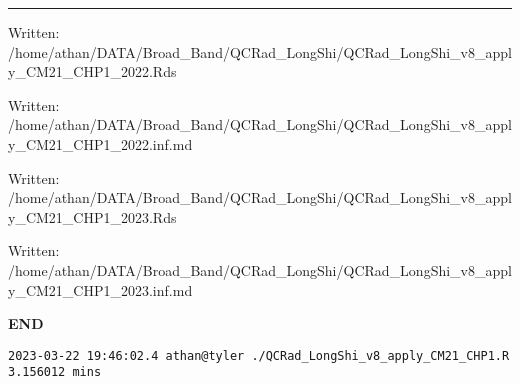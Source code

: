 \documentclass[
  10pt,
  a4paper,oneside]{article}
\begin{document}
\begin{center}\rule{0.5\linewidth}{0.5pt}\end{center}

Written: /home/athan/DATA/Broad\_Band/QCRad\_LongShi/QCRad\_LongShi\_v8\_apply\_CM21\_CHP1\_2022.Rds

Written: /home/athan/DATA/Broad\_Band/QCRad\_LongShi/QCRad\_LongShi\_v8\_apply\_CM21\_CHP1\_2022.inf.md

Written: /home/athan/DATA/Broad\_Band/QCRad\_LongShi/QCRad\_LongShi\_v8\_apply\_CM21\_CHP1\_2023.Rds

Written: /home/athan/DATA/Broad\_Band/QCRad\_LongShi/QCRad\_LongShi\_v8\_apply\_CM21\_CHP1\_2023.inf.md

\textbf{END}

\begin{verbatim}
2023-03-22 19:46:02.4 athan@tyler ./QCRad_LongShi_v8_apply_CM21_CHP1.R 3.156012 mins
\end{verbatim}
\end{document}
